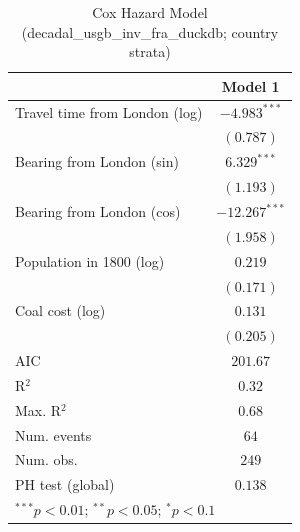 
\begin{table}
\begin{center}
\begin{tabular}{l c}
\hline
 & Model 1 \\
\hline
Travel time from London (log) & $-4.983^{***}$ \\
 & $(0.787)$ \\
Bearing from London (sin) & $6.329^{***}$ \\
 & $(1.193)$ \\
Bearing from London (cos) & $-12.267^{***}$ \\
 & $(1.958)$ \\
Population in 1800 (log) & $0.219$ \\
 & $(0.171)$ \\
Coal cost (log) & $0.131$ \\
 & $(0.205)$ \\
\hline
AIC              & $201.67$ \\
R$^2$            & $0.32$ \\
Max. R$^2$       & $0.68$ \\
Num. events      & $64$ \\
Num. obs.        & $249$ \\
PH test (global) & $0.138$ \\
\hline
\multicolumn{2}{l}{\scriptsize{$^{***}p<0.01$; $^{**}p<0.05$; $^{*}p<0.1$}}
\end{tabular}
\caption{Cox Hazard Model (decadal\_usgb\_inv\_fra\_duckdb; country strata)}
\label{tab:cox_serious_strata_decadal_usgb_inv_fra_duckdb}
\end{center}
\end{table}
